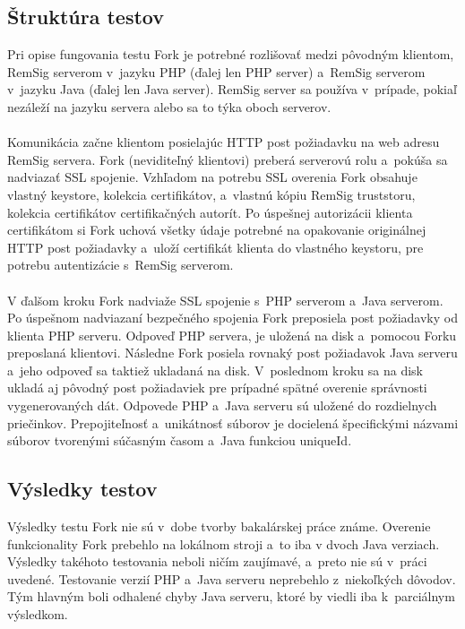 \documentclass[
  printed, %
  table,   %
oneside,
  nolof,     %
  nolot,     %
]{fithesis3}
\begin{document}
\subsection{Štruktúra testov}
Pri opise fungovania testu Fork je potrebné rozlišovať medzi pôvodným klientom, RemSig serverom v~jazyku PHP (ďalej len PHP server) a~RemSig serverom v~jazyku Java (ďalej len Java server). RemSig server sa používa v~prípade, pokiaľ nezáleží na jazyku servera alebo sa to týka oboch serverov. \paragraph{} 
Komunikácia začne klientom posielajúc HTTP post požiadavku na web adresu RemSig servera. Fork (neviditeľný klientovi) preberá serverovú rolu a~pokúša sa nadviazať SSL spojenie. Vzhľadom na potrebu SSL overenia Fork  obsahuje vlastný keystore, kolekcia certifikátov, a~vlastnú kópiu RemSig truststoru, kolekcia certifikátov certifikačných autorít. Po úspešnej autorizácii klienta certifikátom si Fork uchová všetky údaje potrebné na opakovanie originálnej HTTP post požiadavky a~uloží certifikát klienta do vlastného keystoru, pre potrebu autentizácie s~RemSig serverom. \paragraph{}
V ďalšom kroku Fork nadviaže SSL spojenie s~PHP serverom a~Java serverom. Po úspešnom nadviazaní bezpečného spojenia Fork preposiela post požiadavky od klienta PHP serveru. Odpoveď PHP servera, je uložená na disk a~pomocou Forku preposlaná klientovi. Následne Fork posiela rovnaký post požiadavok Java serveru a~jeho odpoveď sa taktiež ukladaná na disk. V~poslednom kroku sa na disk ukladá aj pôvodný post požiadaviek pre prípadné spätné overenie správnosti vygenerovaných dát.
Odpovede PHP a~Java serveru sú uložené do rozdielnych priečinkov. Prepojiteľnosť a~unikátnosť  súborov je docielená špecifickými názvami súborov tvorenými súčasným časom a~Java funkciou  uniqueId. 
\subsection{Výsledky testov}
Výsledky testu Fork nie sú v~dobe tvorby bakalárskej práce známe. Overenie funkcionality Fork prebehlo na lokálnom stroji a~to iba v dvoch Java verziach. Výsledky takéhoto testovania neboli ničím zaujímavé, a~preto nie sú v~práci uvedené. Testovanie verzií PHP a~Java serveru neprebehlo z~niekoľkých dôvodov. Tým hlavným boli odhalené chyby Java serveru, ktoré by viedli iba k~parciálnym výsledkom.
\end{document}

